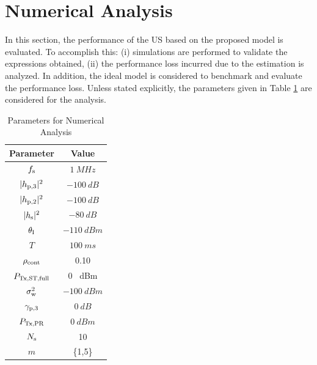 \section{Numerical Analysis} \label{sec:num_ana}
In this section, the performance of the US based on the proposed model is evaluated. To accomplish this: (i) simulations are performed to validate the expressions obtained, (ii) the performance loss incurred due to the estimation is analyzed. In addition, the ideal model is considered to benchmark and evaluate the performance loss. %
Unless stated explicitly, the parameters given in Table \ref{tb:tb2} are considered for the analysis.%



\begin{table}
\renewcommand{\arraystretch}{1.4}
\caption{Parameters for Numerical Analysis}
\label{tb:tb2}
\centering
\begin{tabular}{c||c}
\hline
\bfseries Parameter & \bfseries Value \\
\hline\hline
$f_{\text{s}}$  & $\SI{1}{MHz}$ \\ 
$|h_{\text{p,3}}|^2$ & $\SI{-100}{dB}$ \\ 
$|h_{\text{p,2}}|^2$ & $\SI{-100}{dB}$ \\ 
$|h_{\text{s}}|^2$ & $\SI{-80}{dB}$ \\ 
$\theta_{\text{I}}$ & $\SI{-110}{dBm}$ \\ 
$T$ & $\SI{100}{ms}$ \\ 
$\rho_{\text{cont}}$ & 0.10 \\ 
$P_{\text{Tx,ST,full}}$ & 0 \SI{}{dBm} \\ 
$\sigma^2_{\text{w}}$ & $\SI{-100}{dBm}$ \\ 
${\gamma}_{\text{p,3}}$ & $\SI{0}{dB}$ \\ 
$P_{\text{Tx,PR}}$ & $\SI{0}{dBm}$ \\ 
$N_{\text{s}}$ & 10 \\ 
$m$ & \{1,5\} \\ \hline
\end{tabular}%
\end{table}

